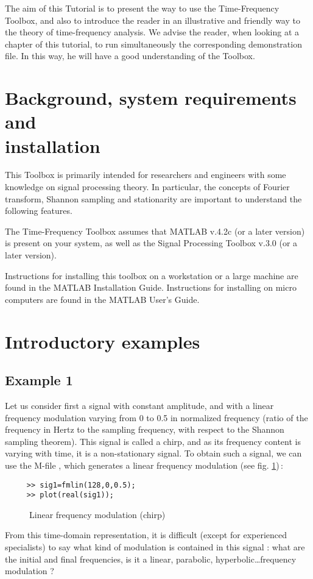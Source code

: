   The aim of this Tutorial is to present the way to use the Time-Frequency
Toolbox, and also to introduce the reader in an illustrative and friendly
way to the theory of time-frequency analysis. We advise the reader, when
looking at a chapter of this tutorial, to run simultaneously the
corresponding demonstration file. In this way, he will have a good
understanding of the Toolbox.


\section{Background, system requirements and\\ installation}
  This Toolbox is primarily intended for researchers and engineers with
some knowledge on signal processing theory. In particular, the concepts of
Fourier transform, Shannon sampling and stationarity are important to
understand the following features.

  The Time-Frequency Toolbox assumes that MATLAB v.4.2c (or a later version)
is present on your system, as well as the Signal Processing Toolbox v.3.0
(or a later version).

  Instructions for installing this toolbox on a workstation or a large
machine are found in the MATLAB Installation Guide. Instructions for
installing on micro computers are found in the MATLAB User's Guide.


\section{Introductory examples}
\subsection{Example 1}

 Let us consider first a signal with constant amplitude, and with a linear
frequency modulation varying from 0 to 0.5 in normalized frequency (ratio
of the frequency in Hertz to the sampling frequency, with respect to the
Shannon sampling theorem). This signal is called a chirp, and as its
frequency content is varying with time, it is a non-stationary signal. To
obtain such a signal, we can use the M-file , which generates a linear frequency modulation
(see fig. \ref{In2fig1})\,:
\begin{verbatim}
     >> sig1=fmlin(128,0,0.5);
     >> plot(real(sig1));
\end{verbatim}
\begin{figure}[htb]
\epsfxsize=10cm
\epsfysize=6cm
\centerline{}
\caption{\label{In2fig1}Linear frequency modulation (chirp)}
\end{figure}
From this time-domain representation, it is difficult (except for
experienced specialists) to say what kind of modulation is contained in
this signal : what are the initial and final frequencies, is it a linear,
parabolic, hyperbolic\ldots frequency modulation ?

